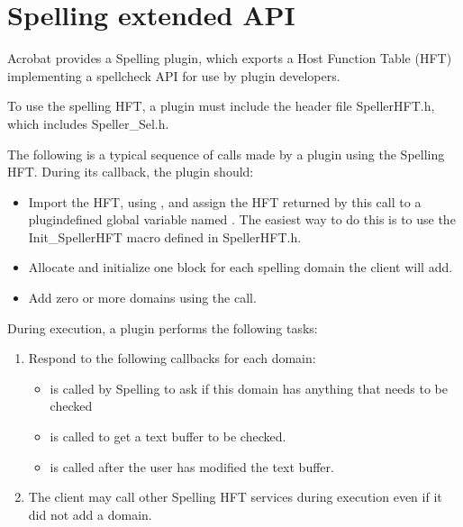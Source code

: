\documentclass[letterpaper,12pt,english,openany,oneside]{sphinxmanual}
\begin{document}
\section{Spelling extended API}
\label{\detokenize{Plugins_ExtendedAPI:spelling-extended-api}}
Acrobat provides a Spelling plugin, which exports a Host Function Table (HFT) implementing a spell\sphinxhyphen{}check API for use by plugin developers.

To use the spelling HFT, a plugin must include the header file SpellerHFT.h, which includes Speller\_Sel.h.

The following is a typical sequence of calls made by a plugin using the Spelling HFT. During its  callback, the plugin should:
\begin{itemize}
\item {} 
Import the HFT, using , and assign the HFT returned by this call to a plugin\sphinxhyphen{}defined global variable named . The easiest way to do this is to use the Init\_SpellerHFT macro defined in SpellerHFT.h.

\item {} 
Allocate and initialize one  block for each spelling domain the client will add.

\item {} 
Add zero or more domains using the  call.

\end{itemize}

During execution, a plugin performs the following tasks:
\begin{enumerate}
%
\item {} 
Respond to the following callbacks for each domain:
\begin{itemize}
\item {} 
 is called by Spelling to ask if this domain has anything that needs to be checked

\item {} 
 is called to get a text buffer to be checked.

\item {} 
 is called after the user has modified the text buffer.

\end{itemize}

\item {} 
The client may call other Spelling HFT services during execution even if it did not add a domain.

\end{enumerate}
\end{document}
